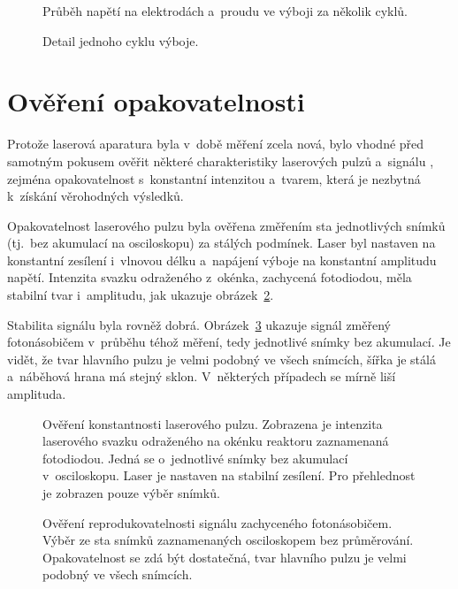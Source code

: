 \begin{figure}[htp]
	\centering
	
	\caption{Průběh napětí na elektrodách a~proudu ve výboji
		za několik cyklů.}
	\label{fig:efish-overview-full}
	\vspace{24pt}
	
	\caption{Detail jednoho cyklu výboje.}
	\label{fig:efish-overview-period}
\end{figure}

\section{Ověření opakovatelnosti}
\label{sec:efish-check}
Protože laserová aparatura byla v~době měření zcela nová,
bylo vhodné před samotným pokusem ověřit některé charakteristiky
laserových pulzů a~signálu \EFISH{},
zejména opakovatelnost s~konstantní intenzitou a~tvarem,
která je nezbytná k~získání věrohodných výsledků.

Opakovatelnost laserového pulzu byla ověřena změřením sta jednotlivých
snímků (tj.~bez akumulací na osciloskopu) za stálých podmínek.
Laser byl nastaven na konstantní zesílení i~vlnovou délku
a~napájení výboje na konstantní amplitudu napětí.
Intenzita svazku odraženého z~okénka, zachycená fotodiodou,
měla stabilní tvar i~amplitudu, jak ukazuje
obrázek~\ref{fig:efish-pulse-compare}.

Stabilita signálu \EFISH{} byla rovněž dobrá.
Obrázek~\ref{fig:efish-singleshots-compare} ukazuje signál
\EFISH{} změřený fotonásobičem v~průběhu téhož měření,
tedy jednotlivé snímky bez akumulací.
Je vidět, že tvar hlavního pulzu je velmi podobný ve všech snímcích,
šířka je stálá a~náběhová hrana má stejný sklon.
V~některých případech se mírně liší amplituda.

\begin{figure}[htp]
	\centering
	
	\caption{Ověření konstantnosti laserového pulzu.
		Zobrazena je intenzita laserového svazku odraženého
		na okénku reaktoru zaznamenaná fotodiodou.
		Jedná se o~jednotlivé snímky bez akumulací v~osciloskopu.
		Laser je nastaven na stabilní zesílení.
		Pro přehlednost je zobrazen pouze výběr snímků.}
	\label{fig:efish-pulse-compare}
\end{figure}

\begin{figure}[htp]
	\centering
	
	\caption{Ověření reprodukovatelnosti signálu \EFISH{} zachyceného
		fotonásobičem.
		Výběr ze sta snímků zaznamenaných osciloskopem bez průměrování.
		Opakovatelnost se zdá být dostatečná,
		tvar hlavního pulzu je velmi podobný ve všech snímcích.}
	\label{fig:efish-singleshots-compare}
\end{figure}

